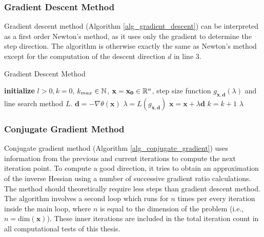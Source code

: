 \documentclass[a4paper,english,titlepage,12pt]{article}
\newcommand{\vect}[1]{\ensuremath{\mathbf{#1}}}
\newcommand{\norm}[1]{\ensuremath\Vert #1 \Vert}
\newcommand{\R}{\ensuremath\mathbb{R}}
\newcommand{\N}{\ensuremath\mathbb{N}}
\begin{document}
\subsubsection{Gradient Descent Method}


Gradient descent method (Algorithm \ref{alg_gradient_descent}) can be interpreted as a first order Newton's method, as it uses only the gradient to determine the step direction. The algorithm is otherwise exactly the same as Newton's method except for the computation of the descent direction $d$ in line 3.

\begin{algorithm}[H]
\caption{Gradient Descent Method}
\label{alg_gradient_descent}
\begin{algorithmic}[1]
\STATE \textbf{initialize} $l > 0, k = 0$, $k_{max} \in \N$, $\vect{x} = \vect{x_0} \in \R^n$, step size function $g_{\vect{x}, \vect{d}}(\lambda)$ and line search method $L$.
\WHILE{$\norm{\nabla \theta(\vect{x})} > l$ \AND $k < k_{max}$}
    \STATE $\vect{d} = -\nabla \theta(\vect{x})$
    \STATE $\lambda = L(g_{\vect{x}, \vect{d}})$
    \STATE $\vect{x} = \vect{x} + \lambda \vect{d}$
    \STATE $k = k + 1$
\ENDWHILE
\RETURN $\lambda$
\end{algorithmic}
\end{algorithm}


\subsubsection{Conjugate Gradient Method}

Conjugate gradient method (Algorithm \ref{alg_conjugate_gradient}) uses information from the previous and current iterations to compute the next iteration point. To compute a good direction, it tries to obtain an approximation of the inverse Hessian using a number of successive gradient ratio calculations. The method should theoretically  require less steps than gradient descent method.
The algorithm involves a second loop which runs for $n$ times per every iteration inside the main loop, where $n$ is equal to the dimension of the problem (i.e., $n = \mathrm{dim}(\vect{x})$). These inner iterations are included in the total iteration count in all computational tests of this thesis.
\end{document}
